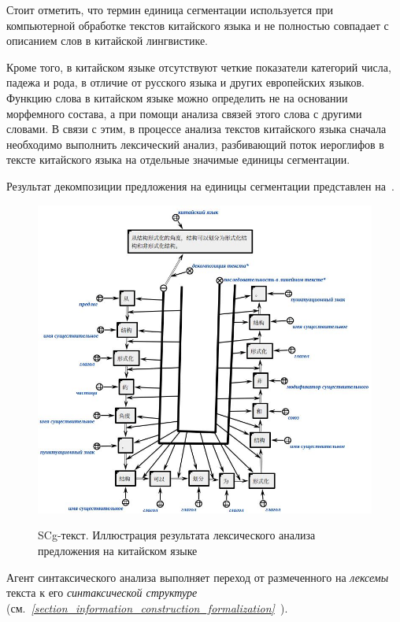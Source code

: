 Стоит отметить, что термин единица сегментации используется при компьютерной обработке текстов китайского языка и не полностью совпадает с описанием слов в китайской лингвистике.

Кроме того, в китайском языке отсутствуют четкие показатели категорий числа, падежа и рода, в отличие от русского языка и других европейских языков.
Функцию слова в китайском языке можно определить не на основании морфемного состава, а при помощи анализа связей этого слова с другими словами.
В связи с этим, в процессе анализа текстов китайского языка сначала необходимо выполнить лексический анализ, разбивающий поток иероглифов в тексте китайского языка на отдельные значимые единицы сегментации.

Результат декомпозиции предложения на единицы сегментации представлен на~\textit{}.

\begin{figure}[H]
	\caption{SCg-текст. Иллюстрация результата лексического анализа предложения на китайском языке}
	\includegraphics[scale=0.6]{images/part4/chapter_chinese/segment_chinese_sentence}
	\label{fig:segment-chinese}
\end{figure}

Агент синтаксического анализа выполняет переход от размеченного на \textit{лексемы} текста к его \textit{синтаксической структуре} (см.~\textit{\ref{section_information_construction_formalization}~}).

